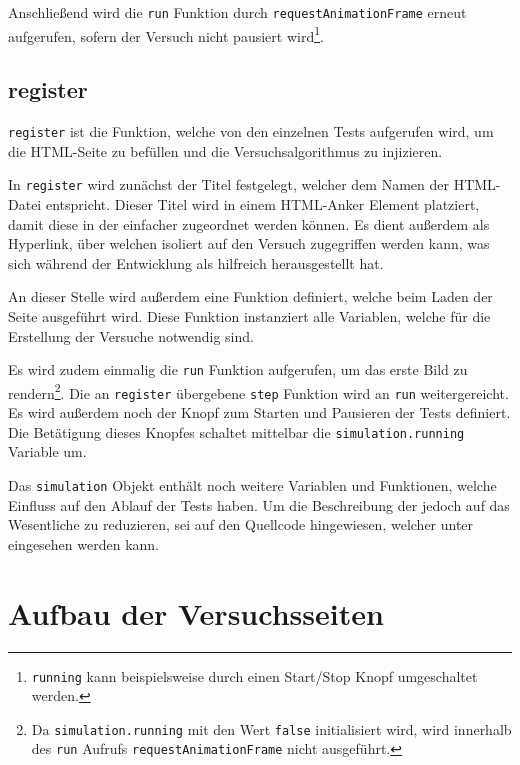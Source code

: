 Anschlie{\ss}end wird die \lstinline{run} Funktion durch \lstinline{requestAnimationFrame} erneut aufgerufen, sofern der Versuch nicht pausiert wird\footnote{\lstinline{running} kann beispielsweise durch einen Start/Stop Knopf umgeschaltet werden.}.

\subsection{register}\label{ch:sim_register}

\lstinline{register} ist die Funktion, welche von den einzelnen Tests aufgerufen wird, um die HTML-Seite zu befüllen und die Versuchsalgorithmus zu injizieren.

In \lstinline{register} wird zunächst der Titel festgelegt, welcher dem Namen der HTML-Datei entspricht.
Dieser Titel wird in einem HTML-Anker Element platziert, damit diese in der  einfacher zugeordnet werden können.
Es dient au{\ss}erdem als Hyperlink, über welchen isoliert auf den Versuch zugegriffen werden kann, was sich während der Entwicklung als hilfreich herausgestellt hat.

An dieser Stelle wird au{\ss}erdem eine Funktion definiert, welche beim Laden der Seite ausgeführt wird.
Diese Funktion instanziert alle Variablen, welche für die Erstellung der Versuche notwendig sind.

Es wird zudem einmalig die \lstinline{run} Funktion aufgerufen, um das erste Bild zu rendern\footnote{Da \lstinline{simulation.running} mit den Wert \lstinline{false} initialisiert wird, wird innerhalb des \lstinline{run} Aufrufs \lstinline{requestAnimationFrame} nicht ausgeführt.}.
Die an \lstinline{register} übergebene \lstinline{step} Funktion wird an \lstinline{run} weitergereicht.
Es wird au{\ss}erdem noch der Knopf zum Starten und Pausieren der Tests definiert.
Die Betätigung dieses Knopfes schaltet mittelbar die \lstinline{simulation.running} Variable um.

Das \lstinline{simulation} Objekt enthält noch weitere Variablen und Funktionen, welche Einfluss auf den Ablauf der Tests haben.
Um die Beschreibung der  jedoch auf das Wesentliche zu reduzieren, sei auf den Quellcode hingewiesen, welcher unter  eingesehen werden kann.

\section{Aufbau der Versuchsseiten}\label{ch:aufbau_der_testseiten}

